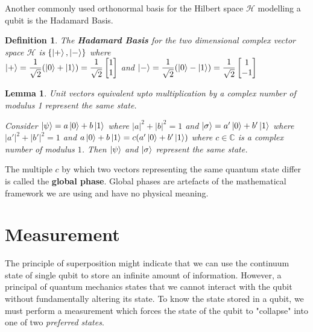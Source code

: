 \documentclass[12pt,twoside]{report}
\theoremstyle{thmstyle}
\newtheorem{defn}[subsection]{Definition}
\newtheorem{lemma}[subsection]{Lemma}
\begin{document}
\vspace*{0.75cm}
Another commonly used orthonormal basis for the Hilbert space $\mathcal{H}$ modelling a qubit is the Hadamard Basis.

\begin{defn}
The \textbf{Hadamard Basis} for the two dimensional complex vector space $\mathcal{H}$ is  $\{ \ket{+}, \ket{-} \}$ where \\
    $\ket{+} = \displaystyle\frac{1}{\sqrt 2} (\ket{0} + \ket{1}) = \frac{1}{\sqrt{2}} \begin{bmatrix} 1 \\ 1 \end{bmatrix}$ and $\ket{-} = \displaystyle\frac{1}{\sqrt 2} (\ket{0} - \ket{1}) = \frac{1}{\sqrt{2}} \begin{bmatrix} 1 \\ -1 \end{bmatrix}$
\end{defn}

\begin{lemma}
    Unit vectors equivalent upto multiplication by a complex number of modulus 1 represent the same state.

    Consider $\ket{\psi} = a \ket{0} + b \ket{1}$ where $|a|^2 + |b|^2 = 1$ and $\ket{\sigma} = a' \ket{0} + b' \ket{1}$ where $|a'|^2 + |b'|^2 = 1$ and $a \ket{0} + b \ket{1} = c (a' \ket{0} + b' \ket{1})$ where $c \in \mathbb{C}$ is a complex number of modulus $1$. Then $\ket\psi$ and $\ket\sigma$ represent the same state.
\end{lemma}

The multiple $c$ by which two vectors representing the same quantum state differ is called the \textbf{global phase}. Global phases are artefacts of the mathematical framework we are using and have no physical meaning.

\section{Measurement}
The principle of superposition might indicate that we can use the continuum state of single qubit to store an infinite amount of information. However, a principal of quantum mechanics states that we cannot interact with the qubit without fundamentally altering its state. To know the state stored in a qubit, we must perform a measurement which forces the state of the qubit to "collapse" into one of two \textit{preferred states}.
\end{document}

